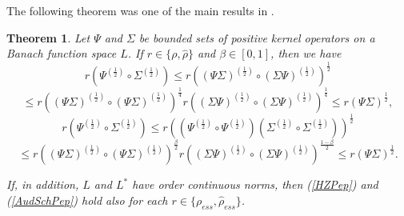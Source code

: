 \documentclass[12pt, reqno]{amsart}
\newtheorem{theorem}{Theorem}[section]
\theoremstyle{definition}
\theoremstyle{remark}
\numberwithin{equation}{section}
\newcommand{\be}{\begin{equation}}
\newcommand{\ee}{\end{equation}}
\begin{document}
The following theorem \cite[Theorem 3.5]{P19} was one of the main results in \cite{P19}.%
\begin{theorem} Let $\Psi $ and $\Sigma$  be bounded sets of positive kernel operators on a Banach function space $L$.
If $r \in \{\rho, \hat{\rho}\}$ and $\beta \in [0,1]$,  then we have
$$r \left(\Psi ^{\left( \frac{1}{2} \right)} \circ \Sigma  ^{\left( \frac{1}{2} \right)} \right) \le  r \left((\Psi \Sigma)^{\left(\frac{1}{2}\right)} \circ (\Sigma \Psi)^{\left(\frac{1}{2}\right)}\right) ^{\frac{1}{2}}  $$
\be
\le   r \left((\Psi \Sigma)^{\left(\frac{1}{2}\right)} \circ (\Psi \Sigma)^{\left(\frac{1}{2}\right)}\right) ^{\frac{1}{4}}   r \left((\Sigma\Psi)^{\left(\frac{1}{2}\right)} \circ ( \Sigma \Psi)^{\left(\frac{1}{2}\right)}\right) ^{\frac{1}{4}} \le r (\Psi \Sigma) ^{\frac{1}{2}},
\label{HZPep}
\ee
$$r \left(\Psi ^{\left( \frac{1}{2} \right)} \circ \Sigma  ^{\left( \frac{1}{2} \right)} \right) \le r \left( \left (\Psi ^{\left( \frac{1}{2} \right)} \circ \Psi  ^{\left( \frac{1}{2} \right)}\right) \left (\Sigma^{\left( \frac{1}{2} \right)} \circ \Sigma  ^{\left( \frac{1}{2} \right)}\right) \right)  ^{\frac{1}{2} }   $$
\be
   \le r \left((\Psi \Sigma)^{\left(\frac{1}{2}\right)} \circ (\Psi \Sigma)^{\left(\frac{1}{2}\right)}\right) ^{\frac{\beta}{2}}   r \left((\Sigma\Psi)^{\left(\frac{1}{2}\right)} \circ ( \Sigma \Psi)^{\left(\frac{1}{2}\right)}\right) ^{\frac{1-\beta}{2}} \le  r (\Psi \Sigma) ^{\frac{1}{2}}.
\label{AudSchPep}
\ee

If, in addition, $L$ and $L^*$ have order continuous norms, then (\ref{HZPep}) and (\ref{AudSchPep}) hold also for each $r\in \{ \rho _{ess}, \hat{\rho} _{ess}\}$.
\label{refin}
\end{theorem}
\end{document}
